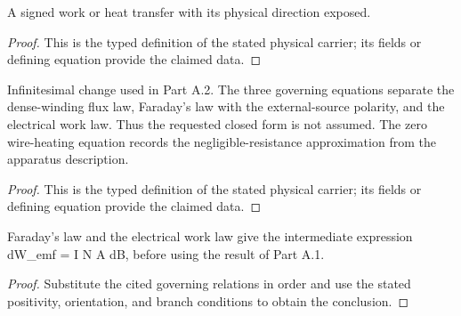 \begin{definition}
  \label{def:physics:IPhO_2026_3_A_2:aux015}
  A signed work or heat transfer with its physical direction exposed.
\end{definition}
\begin{proof}
  This is the typed definition of the stated physical carrier; its fields or defining equation provide the claimed data.
\end{proof}

\begin{definition}
  \label{def:physics:IPhO_2026_3_A_2:aux016}
  Infinitesimal change used in Part A.2. The three governing equations separate the dense-winding flux law, Faraday's law with the external-source polarity, and the electrical work law. Thus the requested closed form is not assumed. The zero wire-heating equation records the negligible-resistance approximation from the apparatus description.
\end{definition}
\begin{proof}
  This is the typed definition of the stated physical carrier; its fields or defining equation provide the claimed data.
\end{proof}

\begin{lemma}
  \label{lem:physics:IPhO_2026_3_A_2:aux017}
  Faraday's law and the electrical work law give the intermediate expression dW\_emf = I N A dB, before using the result of Part A.1.
\end{lemma}
\begin{proof}
  Substitute the cited governing relations in order and use the stated positivity, orientation, and branch conditions to obtain the conclusion.
\end{proof}
